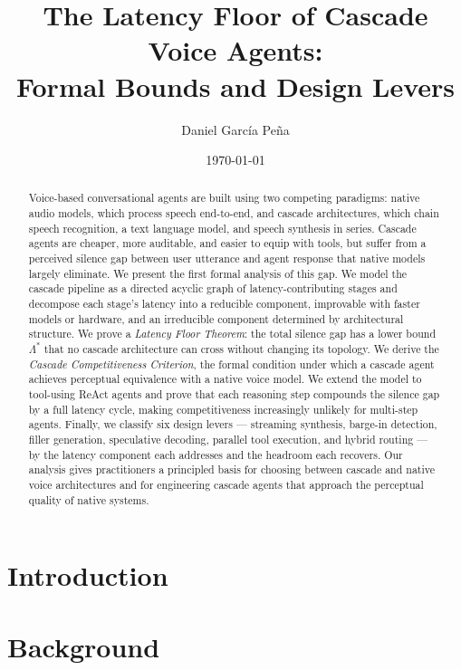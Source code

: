 \documentclass[11pt,a4paper]{article}
\title{The Latency Floor of Cascade Voice Agents:\\
Formal Bounds and Design Levers}
\author[1,2]{Daniel Garc\'ia Pe\~na}
\affil[1]{Department of Energy and Process Control, University of Oviedo, Oviedo, Spain.}
\affil[2]{AI Engineering, Unicaja Bank, Spain.
  \texttt{info@iamdgarcia.com}}
\date{\today}
\theoremstyle{definition}
\begin{document}
\maketitle

\begin{abstract}
Voice-based conversational agents are built using two competing paradigms:
native audio models, which process speech end-to-end, and cascade architectures,
which chain speech recognition, a text language model, and speech synthesis in
series.
Cascade agents are cheaper, more auditable, and easier to equip with tools, but
suffer from a perceived silence gap between user utterance and agent response
that native models largely eliminate.
We present the first formal analysis of this gap.
We model the cascade pipeline as a directed acyclic graph of latency-contributing
stages and decompose each stage's latency into a reducible component, improvable
with faster models or hardware, and an irreducible component determined by
architectural structure.
We prove a \emph{Latency Floor Theorem}: the total silence gap has a lower bound
$\Lambda^*$ that no cascade architecture can cross without changing its topology.
We derive the \emph{Cascade Competitiveness Criterion}, the formal condition under
which a cascade agent achieves perceptual equivalence with a native voice model.
We extend the model to tool-using ReAct agents and prove that each reasoning step
compounds the silence gap by a full latency cycle, making competitiveness
increasingly unlikely for multi-step agents.
Finally, we classify six design levers --- streaming synthesis, barge-in
detection, filler generation, speculative decoding, parallel tool execution, and
hybrid routing --- by the latency component each addresses and the headroom each
recovers.
Our analysis gives practitioners a principled basis for choosing between cascade
and native voice architectures and for engineering cascade agents that approach
the perceptual quality of native systems.
\end{abstract}

\section{Introduction}
\label{sec:introduction}


\section{Background}
\label{sec:background}

\end{document}
